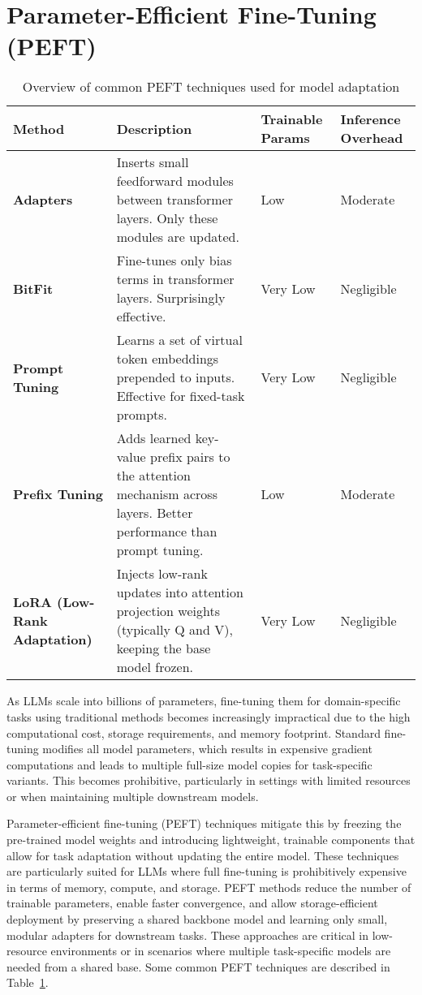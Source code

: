 \section{Parameter-Efficient Fine-Tuning (PEFT)}

\begin{table}[t]
  \centering
  \scriptsize
  \begin{tabularx}{0.95\textwidth}{
    >{\raggedright\arraybackslash}p{3cm}
    >{\raggedright\arraybackslash}X
    >{\centering\arraybackslash}p{2cm}
    >{\centering\arraybackslash}p{2cm}
  }
    \toprule
    \textbf{Method} & \textbf{Description} & \textbf{Trainable Params} & \textbf{Inference Overhead} \\
    \midrule
    \textbf{Adapters} & Inserts small feedforward modules between transformer layers. Only these modules are updated. & Low & Moderate \\
    \textbf{BitFit} & Fine-tunes only bias terms in transformer layers. Surprisingly effective. & Very Low & Negligible \\
    \textbf{Prompt Tuning} & Learns a set of virtual token embeddings prepended to inputs. Effective for fixed-task prompts. & Very Low & Negligible \\
    \textbf{Prefix Tuning} & Adds learned key-value prefix pairs to the attention mechanism across layers. Better performance than prompt tuning. & Low & Moderate \\
    \textbf{LoRA (Low-Rank Adaptation)} & Injects low-rank updates into attention projection weights (typically Q and V), keeping the base model frozen. & Very Low & Negligible \\
    \bottomrule
  \end{tabularx}
  \caption{Overview of common PEFT techniques used for model adaptation}
  \label{table:common_peft}
\end{table}

As LLMs scale into billions of parameters, fine-tuning them for domain-specific tasks
using traditional methods becomes increasingly impractical due to the high computational
cost, storage requirements, and memory footprint. Standard fine-tuning modifies
all model parameters, which results in expensive gradient computations and leads to multiple
full-size model copies for task-specific variants. This becomes prohibitive, particularly
in settings with limited resources or when maintaining multiple downstream models.

Parameter-efficient fine-tuning (PEFT) techniques mitigate this by freezing the pre-trained
model weights and introducing lightweight, trainable components that allow for
task adaptation without updating the entire model. These techniques are particularly
suited for LLMs where full fine-tuning is prohibitively expensive in terms of memory,
compute, and storage. PEFT methods reduce the number of trainable parameters, enable
faster convergence, and allow storage-efficient deployment by preserving a shared
backbone model and learning only small, modular adapters for downstream tasks. These
approaches are critical in low-resource environments or in scenarios where multiple task-specific
models are needed from a shared base. Some common PEFT techniques are
described in Table~\ref{table:common_peft}.

